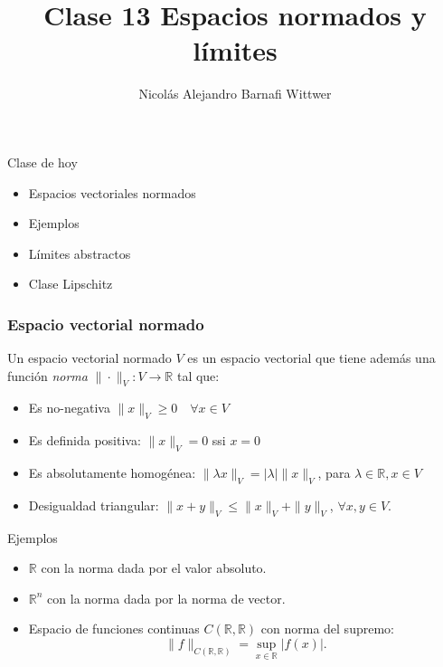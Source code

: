\documentclass[12pt,aspectratio=169,xcolor=dvipsnames]{beamer}
\title[short title]{Clase 13 Espacios normados y límites}
\subtitle{}
\author[NA Barnafi] {Nicolás Alejandro Barnafi Wittwer}
\institute[UC|CMM] 
{
    Pontificia Universidad Católica de Chile \\
    Centro de Modelamiento Matemático
}
\date{}
\newcommand{\R}{\mathbb{R}}
\begin{document}
\begin{frame}
    \maketitle
\end{frame}
\begin{frame}{Clase de hoy}
    \begin{itemize}
        \item Espacios vectoriales normados
        \item Ejemplos
        \item Límites abstractos
        \item Clase Lipschitz
    \end{itemize}

    \vspace{1cm}
\end{frame}
\begin{frame}\frametitle{Espacio vectorial normado}
    Un espacio vectorial normado $V$ es un espacio vectorial que tiene además una función \emph{norma} $\|\cdot\|_V:V \to \R$ tal que: 
    \begin{itemize}
        \item Es no-negativa $\|x\|_V\geq 0\quad\forall x \in V$
        \item Es definida positiva: $\|x\|_V=0$ ssi $x=0$ 
        \item Es absolutamente homogénea: $\|\lambda x\|_V = |\lambda| \|x\|_V$, para $\lambda \in \R, x\in V$
        \item Desigualdad triangular: $\|x+y\|_V \leq \|x\|_V + \|y \|_V$, $\forall x,y \in V$. 
    \end{itemize}

\end{frame}
\begin{frame}{Ejemplos}
    \begin{itemize}
        \item $\R$ con la norma dada por el valor absoluto.
        \item $\R^n$ con la norma dada por la norma de vector.
        \item Espacio de funciones continuas $C(\R,\R)$ con norma del supremo: 
            $$ \| f \|_{C(\R,\R)} = \sup_{x\in \R}|f(x)|. $$
    \end{itemize}
\end{frame}
\end{document}
